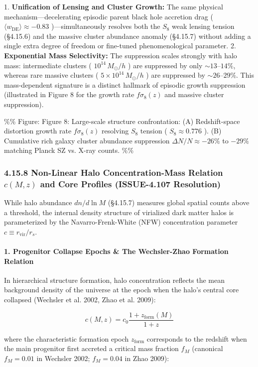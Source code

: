 \documentclass[11pt,a4paper]{article}
\theoremstyle{definition}\newtheorem{definition}{Definition}
\theoremstyle{remark}\newtheorem{remark}{Remark}
\begin{document}
1. \textbf{Unification of Lensing and Cluster Growth:} The same physical mechanism—decelerating episodic parent black hole accretion drag ( $\langle w_{\text{DE}} \rangle \approx -0.83$ )—simultaneously resolves both the $S_8$ weak lensing tension (§4.15.6) and the massive cluster abundance anomaly (§4.15.7) without adding a single extra degree of freedom or fine-tuned phenomenological parameter.
2. \textbf{Exponential Mass Selectivity:} The suppression scales strongly with halo mass: intermediate clusters ( $10^{14} \, M_\odot/h$ ) are suppressed by only $\sim 13\text{--}14\%$, whereas rare massive clusters ( $5 \times 10^{14} \, M_\odot/h$ ) are suppressed by $\sim 26\text{--}29\%$. This mass-dependent signature is a distinct hallmark of episodic growth suppression (illustrated in Figure 8 for the growth rate $f\sigma_8(z)$ and massive cluster suppression).

\%\% Figure: Figure 8: Large-scale structure confrontation: (A) Redshift-space distortion growth rate $f\sigma_8(z)$ resolving $S_8$ tension ( $S_8 \approx 0.776$ ). (B) Cumulative rich galaxy cluster abundance suppression $\Delta N / N \approx -26\%$ to $-29\%$ matching Planck SZ vs. X-ray counts. \%\%
\subsubsection{4.15.8 Non-Linear Halo Concentration-Mass Relation $c(M, z)$ and Core Profiles (ISSUE-4.107 Resolution)}

While halo abundance $dn/d\ln M$ (§4.15.7) measures global spatial counts above a threshold, the internal density structure of virialized dark matter halos is parameterized by the Navarro-Frenk-White (NFW) concentration parameter $c \equiv r_{\text{vir}} / r_s$.
\paragraph{1. Progenitor Collapse Epochs \& The Wechsler-Zhao Formation Relation}

In hierarchical structure formation, halo concentration reflects the mean background density of the universe at the epoch when the halo's central core collapsed (Wechsler et al. 2002, Zhao et al. 2009):


\begin{equation}
c(M, z) = c_0 \frac{1 + z_{\text{form}}(M)}{1 + z}
\end{equation}


where the characteristic formation epoch $z_{\text{form}}$ corresponds to the redshift when the main progenitor first accreted a critical mass fraction $f_M$ (canonical $f_M = 0.01$ in Wechsler 2002; $f_M = 0.04$ in Zhao 2009):
\end{document}
